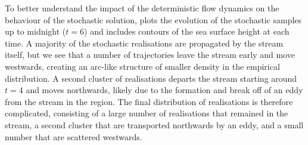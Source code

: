To better understand the impact of the deterministic flow dynamics on the behaviour of the stochastic solution,  plots the evolution of the stochastic samples up to midnight  (\(t = 6\)) and includes contours of the sea surface height at each time.
A majority of the stochastic realisations are propagated by the stream itself, but we see that a number of trajectories leave the stream early and move westwards, creating an arc-like structure of smaller density in the empirical distribution.
A second cluster of realisations departs the stream starting around \(t = 4\) and moves northwards, likely due to the formation and break off of an eddy from the stream in the region.
The final distribution of realisations is therefore complicated, consisting of a large number of realisations that remained in the stream, a second cluster that are transported northwards by an eddy, and a small number that are scattered westwards.

